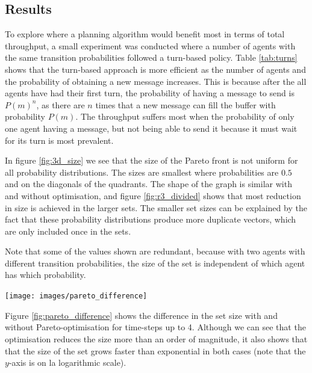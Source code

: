 \documentclass{article}
\makeatletter
\newenvironment{figurehere}
{\def\@captype{figure}}
{}
\makeatother
\begin{document}
	\begin{multicols}{2}
	\section{Results}
	\label{sec:results}
	To explore where a planning algorithm would benefit most in terms of total
	throughput, a small experiment was conducted where a number of agents with
	the same transition probabilities followed a turn-based policy.
	Table \ref{tab:turns} shows that the turn-based approach is more efficient
	as the number of agents and the probability of obtaining a new message
	increases. This is because after the all agents have had their first turn,
	the probability of having a message to send is $P(m)^n$, as there are
	$n$ times that a new message can fill the buffer with probability $P(m)$.
	The throughput suffers most when the probability of only one agent having a
	message, but not being able to send it because it must wait for its turn is
	most prevalent.

	In figure \ref{fig:3d_size} we see that the size of the Pareto front is not
	uniform for all probability distributions. The sizes are smallest where
	probabilities are $0.5$ and on the diagonals of the quadrants.
	The shape of the graph is similar with and without optimisation, and figure
	\ref{fig:r3_divided} shows that most reduction in size is achieved in the
	larger sets.
	The smaller set sizes can be explained by the fact that these probability
	distributions produce more duplicate vectors, which are only included once
	in the sets.

	Note that some of the values shown are redundant, because with two agents
	with different transition probabilities, the size of the set is independent
	of which agent has which probability.

	\vspace{.5cm}
	\begin{figurehere}
		\centering
		\texttt{[image: images/pareto\_difference]}
	   \label{fig:pareto_difference}
	\end{figurehere}
	\vspace{0.5cm}

	Figure \ref{fig:pareto_difference} shows the difference in the set size with
	and without Pareto-optimisation for time-steps up to 4. Although we can see
	that the optimisation reduces the size more than an order of magnitude, it
	also shows that that the size of the set grows faster than exponential in
	both cases (note that the $y$-axis is on la logarithmic scale).


\end{multicols}
\end{document}
